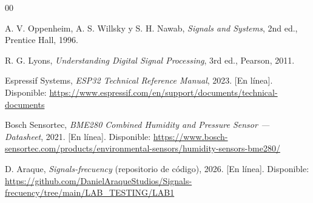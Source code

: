 
\begin{thebibliography}{00}

A. V. Oppenheim, A. S. Willsky y S. H. Nawab,
\textit{Signals and Systems},
2nd ed., Prentice Hall, 1996.

R. G. Lyons,
\textit{Understanding Digital Signal Processing},
3rd ed., Pearson, 2011.

Espressif Systems,
\textit{ESP32 Technical Reference Manual},
2023. [En línea]. Disponible: \url{https://www.espressif.com/en/support/documents/technical-documents}

Bosch Sensortec,
\textit{BME280 Combined Humidity and Pressure Sensor — Datasheet},
2021. [En línea]. Disponible: \url{https://www.bosch-sensortec.com/products/environmental-sensors/humidity-sensors-bme280/}

D. Araque,
\textit{Signals-frecuency} (repositorio de código),
2026. [En línea]. Disponible: \url{https://github.com/DanielAraqueStudios/Signals-frecuency/tree/main/LAB_TESTING/LAB1}

\end{thebibliography}
